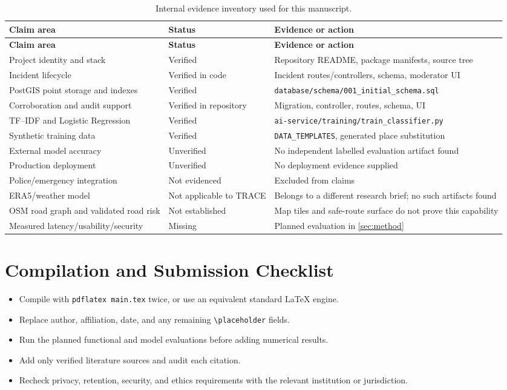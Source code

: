 \documentclass[11pt]{article}
\begin{document}
\begin{longtable}{p{}p{}p{}}
\caption{Internal evidence inventory used for this manuscript.}\\
\toprule
\textbf{Claim area} & \textbf{Status} & \textbf{Evidence or action}\\
\midrule
\endfirsthead
\toprule
\textbf{Claim area} & \textbf{Status} & \textbf{Evidence or action}\\
\midrule
\endhead
Project identity and stack & Verified & Repository README, package manifests, source tree\\
Incident lifecycle & Verified in code & Incident routes/controllers, schema, moderator UI\\
PostGIS point storage and indexes & Verified & \texttt{database/schema/001\_initial\_schema.sql}\\
Corroboration and audit support & Verified in repository & Migration, controller, routes, schema, UI\\
TF--IDF and Logistic Regression & Verified & \texttt{ai-service/training/train\_classifier.py}\\
Synthetic training data & Verified & \texttt{DATA\_TEMPLATES}, generated place substitution\\
External model accuracy & Unverified & No independent labelled evaluation artifact found\\
Production deployment & Unverified & No deployment evidence supplied\\
Police/emergency integration & Not evidenced & Excluded from claims\\
ERA5/weather model & Not applicable to TRACE & Belongs to a different research brief; no such artifacts found\\
OSM road graph and validated road risk & Not established & Map tiles and safe-route surface do not prove this capability\\
Measured latency/usability/security & Missing & Planned evaluation in \cref{sec:method}\\
\bottomrule
\end{longtable}

\section{Compilation and Submission Checklist}
\begin{itemize}
  \item Compile with \texttt{pdflatex main.tex} twice, or use an equivalent
  standard LaTeX engine.
  \item Replace author, affiliation, date, and any remaining
  \texttt{\textbackslash placeholder} fields.
  \item Run the planned functional and model evaluations before adding
  numerical results.
  \item Add only verified literature sources and audit each citation.
  \item Recheck privacy, retention, security, and ethics requirements with
  the relevant institution or jurisdiction.
\end{itemize}
\end{document}
